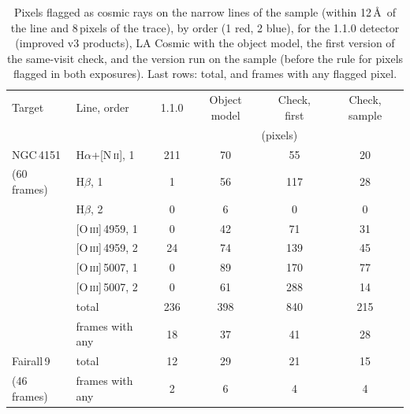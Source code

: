 \begin{table}[!htbp]
\centering\small
\caption{Pixels flagged as cosmic rays on the narrow lines of the sample (within 12\,\AA\ of the line and 8\,pixels of
the trace), by order (1 red, 2 blue), for the 1.1.0 detector (improved v3 products), LA Cosmic with the object model, the
first version of the same-visit check, and the version run on the sample (before the rule for pixels flagged in both
exposures). Last rows: total, and frames with any flagged pixel.}
\label{tab:cr_pair_lines}
\begin{tabular}{llcccc}
\toprule
Target & Line, order & 1.1.0 & Object model & Check, first & Check, sample \\
 & & \multicolumn{4}{c}{(pixels)} \\
\midrule
NGC\,4151 & H$\alpha$+[N\,\textsc{ii}], 1 & 211 & 70 & 55 & 20 \\
(60 frames) & H$\beta$, 1 & 1 & 56 & 117 & 28 \\
 & H$\beta$, 2 & 0 & 6 & 0 & 0 \\
 & [O\,\textsc{iii}]\,4959, 1 & 0 & 42 & 71 & 31 \\
 & [O\,\textsc{iii}]\,4959, 2 & 24 & 74 & 139 & 45 \\
 & [O\,\textsc{iii}]\,5007, 1 & 0 & 89 & 170 & 77 \\
 & [O\,\textsc{iii}]\,5007, 2 & 0 & 61 & 288 & 14 \\
 & total & 236 & 398 & 840 & 215 \\
 & frames with any & 18 & 37 & 41 & 28 \\
\midrule
Fairall\,9 & total & 12 & 29 & 21 & 15 \\
(46 frames) & frames with any & 2 & 6 & 4 & 4 \\
\bottomrule
\end{tabular}
\end{table}

